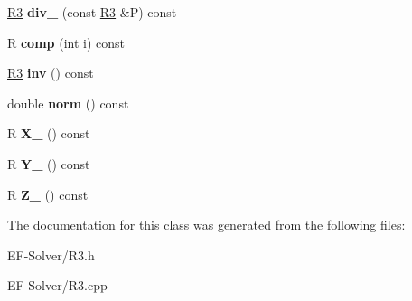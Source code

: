 \begin{DoxyCompactItemize}
\item 
\hyperlink{class_r3}{R3} {\bfseries div\+\_\+} (const \hyperlink{class_r3}{R3} \&P) const \hypertarget{class_r3_a704360076265d7b4e7660c1e08593a90}{}\label{class_r3_a704360076265d7b4e7660c1e08593a90}

\item 
R {\bfseries comp} (int i) const \hypertarget{class_r3_afb8e0fa9d7028873d8669f5545d26bc4}{}\label{class_r3_afb8e0fa9d7028873d8669f5545d26bc4}

\item 
\hyperlink{class_r3}{R3} {\bfseries inv} () const \hypertarget{class_r3_a0a6c9ade1ee39ec0baf415e8db0cf556}{}\label{class_r3_a0a6c9ade1ee39ec0baf415e8db0cf556}

\item 
double {\bfseries norm} () const \hypertarget{class_r3_a12083e309481e4769e51db4bd772c925}{}\label{class_r3_a12083e309481e4769e51db4bd772c925}

\item 
R {\bfseries X\+\_\+} () const \hypertarget{class_r3_a699149de054f8654456d69866663ab78}{}\label{class_r3_a699149de054f8654456d69866663ab78}

\item 
R {\bfseries Y\+\_\+} () const \hypertarget{class_r3_a25acf0bc622d27eb6501613dee127b98}{}\label{class_r3_a25acf0bc622d27eb6501613dee127b98}

\item 
R {\bfseries Z\+\_\+} () const \hypertarget{class_r3_ac33c49227baec220003f7ae9d2100eac}{}\label{class_r3_ac33c49227baec220003f7ae9d2100eac}

\end{DoxyCompactItemize}


The documentation for this class was generated from the following files\+:\begin{DoxyCompactItemize}
\item 
E\+F-\/\+Solver/R3.\+h\item 
E\+F-\/\+Solver/R3.\+cpp\end{DoxyCompactItemize}
